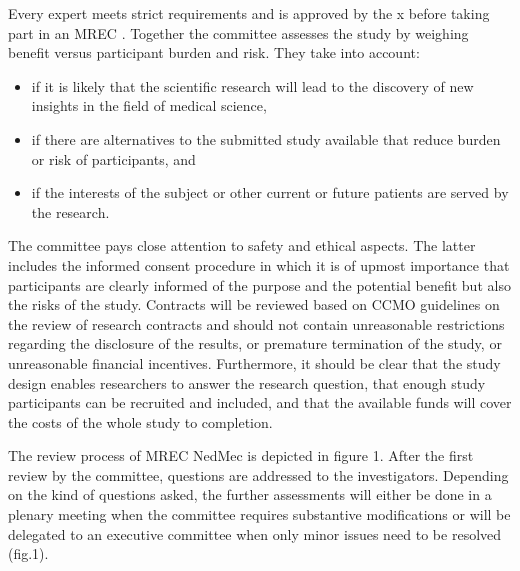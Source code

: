 \documentclass[authordate, empirical]{jote-new-article}
\begin{document}
	Every expert meets strict requirements and is approved by the x before taking part in an MREC \parencites{CCMO2020}. Together the committee assesses the study by weighing benefit versus participant burden and risk. They take into account:

	\begin{itemize}


		\item if it is likely that the scientific research will lead to the discovery of new insights in the field of medical science,



		\item
		if there are alternatives to the submitted study available that reduce burden or risk of participants, and



		\item if the interests of the subject or other current or future patients are served by the research.


	\end{itemize}

	The committee pays close attention to safety and ethical aspects. The latter includes the informed consent procedure in which it is of upmost importance that participants are clearly informed of the purpose and the potential benefit but also the risks of the study. Contracts will be reviewed based on CCMO guidelines on the review of research contracts \parencites{CCMO2011} and should not contain unreasonable restrictions regarding the disclosure of the results, or premature termination of the study, or unreasonable financial incentives. Furthermore, it should be clear that the study design enables researchers to answer the research question, that enough study participants can be recruited and included, and that the available funds will cover the costs of the whole study to completion.



	The review process of MREC NedMec is depicted in figure 1. After the first review by the committee, questions are addressed to the investigators. Depending on the kind of questions asked, the further assessments will either be done in a plenary meeting when the committee requires substantive modifications or will be delegated to an executive committee when only minor issues need to be resolved (fig.1).
\end{document}
